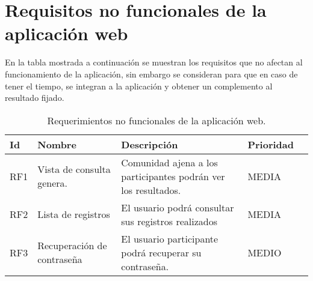 \section{Requisitos no funcionales de la aplicación web}
En la tabla mostrada a continuación se muestran los requisitos que no afectan al funcionamiento de la aplicación, sin embargo se consideran para que en caso de tener el tiempo, se integran a la aplicación y obtener un complemento al resultado fijado.
\begin{table}[htbp]
	\begin{center}
		\begin{tabular}{|l|p{45mm}|p{45mm}|p{45mm}|l}
			\hline
			Id & Nombre & Descripción & Prioridad \\
			\hline 
			RF1 & Vista de consulta genera. & Comunidad ajena a los participantes podrán ver los resultados. & MEDIA \\ \hline
			RF2 & Lista de registros &El usuario podrá consultar sus registros realizados & MEDIA   \\ \hline
			RF3 & Recuperación de contraseña &El usuario participante podrá recuperar su contraseña. & MEDIO \\ \hline
		\end{tabular}
		\caption{Requerimientos no funcionales de la aplicación web.}
		\label{tabla:sencilla}
	\end{center}
\end{table}
\pagebreak

